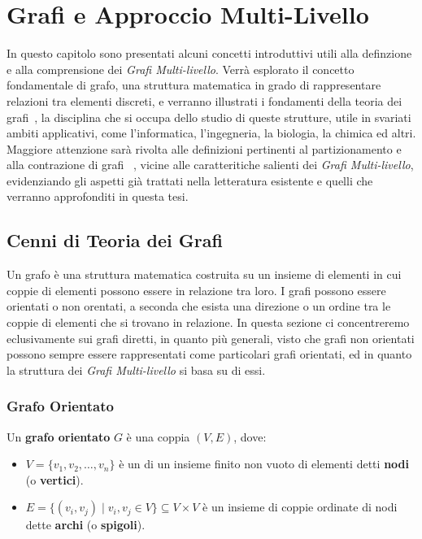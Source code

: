 \chapter{Grafi e Approccio Multi-Livello}\label{ch:cap1}

In questo capitolo sono presentati alcuni concetti introduttivi utili alla definzione e alla comprensione dei
\textit{Grafi Multi-livello}.
Verr\`a esplorato il concetto fondamentale di grafo, una struttura matematica in grado di rappresentare relazioni tra
elementi discreti, e verranno illustrati i fondamenti della teoria dei grafi~\cite{cormen2010introduction,gross2018graph},
la disciplina che si occupa dello studio di queste strutture, utile in svariati ambiti applicativi, come l'informatica,
l'ingegneria, la biologia, la chimica ed altri.
Maggiore attenzione sar\`a rivolta alle definizioni pertinenti al partizionamento e alla contrazione di
grafi ~\cite{Sanders2012HighQG}, vicine alle caratteritiche salienti dei \textit{Grafi Multi-livello},
evidenziando gli aspetti gi\`a trattati nella letteratura esistente e quelli che verranno approfonditi in questa tesi.

\section{Cenni di Teoria dei Grafi}\label{sec:cenni-di-teoria-dei-grafi}

Un grafo \`e una struttura matematica costruita su un insieme di elementi in cui coppie di elementi possono essere
in relazione tra loro.
I grafi possono essere orientati o non orentati, a seconda che esista una direzione o un ordine tra le coppie
di elementi che si trovano in relazione.
In questa sezione ci concentreremo eclusivamente sui grafi diretti, in quanto pi\`u generali, visto che grafi
non orientati possono sempre essere rappresentati come particolari grafi orientati, ed in quanto la struttura dei
\textit{Grafi Multi-livello} si basa su di essi.

\subsection{Grafo Orientato}\label{subsec:grafo-orientato}

\begin{definition}
    Un \textbf{grafo orientato} $G$ \`e una coppia $(V, E)$, dove:
    \begin{itemize}
        \item $V  = \{v_1, v_2, \ldots, v_n\}$ \`e un di un insieme finito non vuoto di elementi detti \textbf{nodi}
        (o \textbf{vertici}).
        \item $E = \{(v_i, v_j) \mid v_i, v_j \in V\} \subseteq V \times V$ \`e un insieme di coppie ordinate di
        nodi dette \textbf{archi} (o \textbf{spigoli}).
    \end{itemize}
\end{definition}

